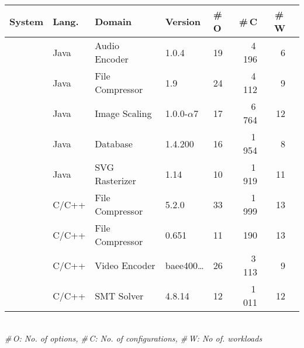 \begin{tabular}{p{1.1cm}p{0.6cm}p{1.9cm}p{0.99cm}p{0.2cm}rrr}
		\toprule
		\textbf{System} & \textbf{Lang.} & \textbf{Domain} & \textbf{Version} & \textbf{\#\,O} & \textbf{\#\,C} & \textbf{\#\,W}  \\
		
		 
		\midrule
		\jumper & Java & Audio Encoder & 1.0.4 & 19 & 4\,196 & 6   \\
		
		\kanzi &Java  & File Compressor & 1.9 & 24 & 4\,112 & 9 \\
			
		\dconvert & Java & Image Scaling & 1.0.0-$\alpha$7 & 17 & 6\,764 & 12  \\
				
		\htwo & Java & Database & 1.4.200 & 16 & 1\,954  & 8  \\
		
		\batik & Java & SVG Rasterizer & 1.14 & 10 & 1\,919 &  11  \\
		
		
		\midrule
		
		\xz & C/C++ & File Compressor & 5.2.0 & 33 & 1\,999 & 13  \\
		\lrzip & C/C++ & File Compressor & 0.651 & 11 & 190 & 13  \\
		
		\xzwo & C/C++ & Video Encoder & baee400\ldots & 26 & 3\,113 & 9  \\
		\zdrei & C/C++ & SMT Solver & 4.8.14 & 12 & 1\,011 & 12  \\
		
\bottomrule

\end{tabular}\\
{\centering\vspace{1mm}\textit{\#\,O: No. of options, \#\,C: No. of configurations, \#\,W: No of. workloads}}
